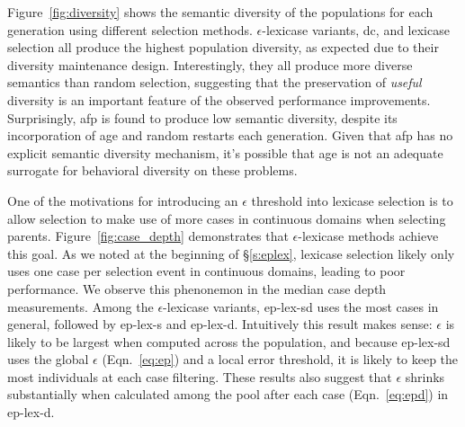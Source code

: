 \documentclass[twoside]{article}
\begin{document}
Figure~\ref{fig:diversity} shows the semantic diversity of the populations for each generation using different selection methods. $\epsilon$-lexicase variants, dc, and lexicase selection all produce the highest population diversity, as expected due to their diversity maintenance design. Interestingly, they all produce more diverse semantics than random selection, suggesting that the preservation of {\it useful} diversity is an important feature of the observed performance improvements. Surprisingly, afp is found to produce low semantic diversity, despite its incorporation of age and random restarts each generation. Given that afp has no explicit semantic diversity mechanism, it's possible that age is not an adequate surrogate for behavioral diversity on these problems. 
  
One of the motivations for introducing an $\epsilon$ threshold into lexicase selection is to allow selection to make use of more cases in continuous domains when selecting parents. Figure~\ref{fig:case_depth} demonstrates that $\epsilon$-lexicase methods achieve this goal. As we noted at the beginning of \S\ref{s:eplex}, lexicase selection likely only uses one case per selection event in continuous domains, leading to poor performance. We observe this phenonemon in the median case depth measurements. Among the $\epsilon$-lexicase variants, ep-lex-sd uses the most cases in general, followed by ep-lex-s and ep-lex-d. Intuitively this result makes sense: $\epsilon$ is likely to be largest when computed across the population, and because ep-lex-sd uses the global $\epsilon$ (Eqn.~\ref{eq:ep}) and a local error threshold, it is likely to keep the most individuals at each case filtering. These results also suggest that $\epsilon$ shrinks substantially when calculated among the pool after each case (Eqn.~\ref{eq:epd}) in ep-lex-d. 
\end{document}
